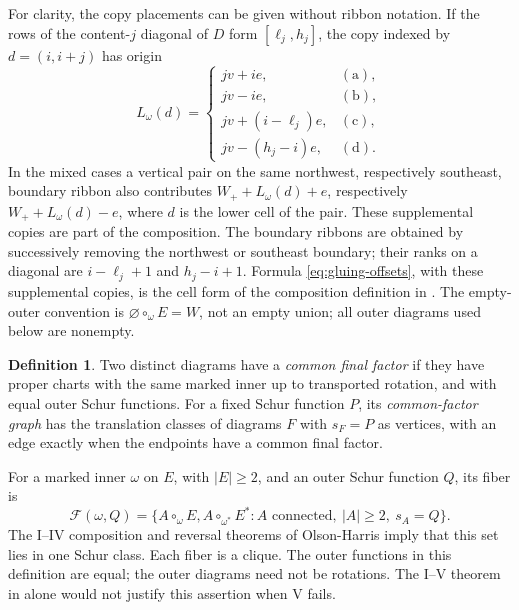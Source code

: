 \documentclass[11pt,a4paper]{amsart}
\numberwithin{equation}{section}
\theoremstyle{plain}
\theoremstyle{definition}
\newtheorem{definition}[theorem]{Definition}
\begin{document}
For clarity, the copy placements can be given without ribbon notation.  If the rows of the content-\(j\) diagonal of \(D\) form \([\ell_j,h_j]\), the copy indexed by \(d=(i,i+j)\) has origin
\begin{equation}\label{eq:gluing-offsets}
 L_\omega(d)=
 \begin{cases}
 jv+ie,&\mathrm{(a)},\\
 jv-ie,&\mathrm{(b)},\\
 jv+(i-\ell_j)e,&\mathrm{(c)},\\
 jv-(h_j-i)e,&\mathrm{(d)}.
 \end{cases}
\end{equation}
In the mixed cases a vertical pair on the same northwest, respectively southeast, boundary ribbon also contributes \(W_++L_\omega(d)+e\), respectively \(W_++L_\omega(d)-e\), where \(d\) is the lower cell of the pair.  These supplemental copies are part of the composition.  The boundary ribbons are obtained by successively removing the northwest or southeast boundary; their ranks on a diagonal are \(i-\ell_j+1\) and \(h_j-i+1\).  Formula \eqref{eq:gluing-offsets}, with these supplemental copies, is the cell form of the composition definition in \cite[Def.~3.11]{McNamara2009Classification}.  The empty-outer convention is \(\varnothing\circ_\omega E=W\), not an empty union; all outer diagrams used below are nonempty.

\begin{definition}\label{def:gluing-graph}
Two distinct diagrams have a \emph{common final factor} if they have proper charts with the same marked inner up to transported rotation, and with equal outer Schur functions.  For a fixed Schur function \(P\), its \emph{common-factor graph} has the translation classes of diagrams \(F\) with \(s_F=P\) as vertices, with an edge exactly when the endpoints have a common final factor.
\end{definition}

For a marked inner \(\omega\) on \(E\), with \(|E|\ge2\), and an outer Schur function \(Q\), its fiber is
\begin{equation*}
 \mathcal F(\omega,Q)=
 \{A\circ_\omega E,
   A\circ_{\omega^*}E^*: A\text{ connected},\ |A|\ge2,\ s_A=Q\}.
\end{equation*}
The I--IV composition and reversal theorems of Olson-Harris \cite[Thms.~5.3.9 and~5.3.10]{OlsonHarris2024HopfApplications} imply that this set lies in one Schur class.  Each fiber is a clique.  The outer functions in this definition are equal; the outer diagrams need not be rotations.  The I--V theorem in \cite[Thm.~3.31]{McNamara2009Classification} alone would not justify this assertion when V fails.
\end{document}
